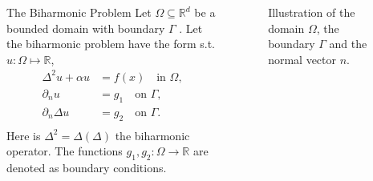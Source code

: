 \begin{frame}
\begin{columns}
\begin{block}{The Biharmonic Problem}
Let $\Omega \subseteq \mathbb{R} ^d$ be a bounded domain with boundary $\Gamma $ . Let the biharmonic problem have the form s.t. $u:\Omega \mapsto \mathbb{R} $,
\begin{equation}
\label{eq:bi_problem}
\begin{split}
\Delta^2 u + \alpha u & = f( x) \quad \text{in } \Omega, \\
\partial_{n} u & = g_{1} \quad \text{on } \Gamma , \\
\partial_{n} \Delta u & = g_{2} \quad \text{on } \Gamma . \\
\end{split}
\end{equation}
Here is $\Delta ^2 = \Delta \left( \Delta \right) $ the biharmonic operator. The functions $g_{1},g_{2}: \Omega \to \mathbb{R}$ are denoted as boundary conditions.
\end{block}

\begin{figure}[htpb!]
    \centering
    \caption{ Illustration of the domain $\Omega $, the boundary $\Gamma $ and the normal vector $n$. }
    \label{fig:domain_construction}
\end{figure}
\end{columns}

\end{frame}

